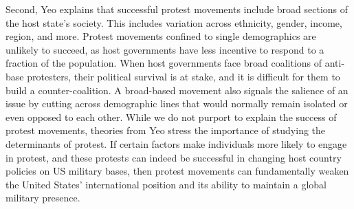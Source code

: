 Second, Yeo explains that successful protest movements include broad sections of the host state's society. This includes variation across ethnicity, gender, income, region, and more. Protest movements confined to single demographics are unlikely to succeed, as host governments have less incentive to respond to a fraction of the population. When host governments face broad coalitions of anti-base protesters, their political survival is at stake, and it is difficult for them to build a counter-coalition. A broad-based movement also signals the salience of an issue by cutting across demographic lines that would normally remain isolated or even opposed to each other. While we do not purport to explain the success of protest movements, theories from Yeo stress the importance of studying the determinants of protest.\autocite{Yeo2011} If certain factors make individuals more likely to engage in protest, and these protests can indeed be successful in changing host country policies on US  military bases, then protest movements can fundamentally weaken the United States' international position and its ability to maintain a global military presence.  



